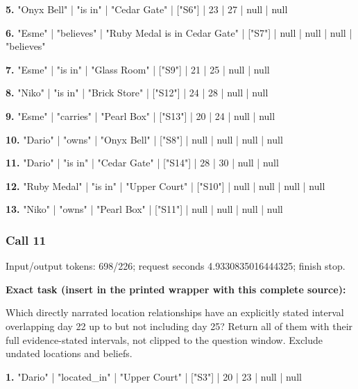 \noindent\textbf{5.} "Onyx Bell" | "is in" | "Cedar Gate" | ["S6"] | 23 | 27 | null | null\par\smallskip

\noindent\textbf{6.} "Esme" | "believes" | "Ruby Medal is in Cedar Gate" | ["S7"] | null | null | null | "believes"\par\smallskip

\noindent\textbf{7.} "Esme" | "is in" | "Glass Room" | ["S9"] | 21 | 25 | null | null\par\smallskip

\noindent\textbf{8.} "Niko" | "is in" | "Brick Store" | ["S12"] | 24 | 28 | null | null\par\smallskip

\noindent\textbf{9.} "Esme" | "carries" | "Pearl Box" | ["S13"] | 20 | 24 | null | null\par\smallskip

\noindent\textbf{10.} "Dario" | "owns" | "Onyx Bell" | ["S8"] | null | null | null | null\par\smallskip

\noindent\textbf{11.} "Dario" | "is in" | "Cedar Gate" | ["S14"] | 28 | 30 | null | null\par\smallskip

\noindent\textbf{12.} "Ruby Medal" | "is in" | "Upper Court" | ["S10"] | null | null | null | null\par\smallskip

\noindent\textbf{13.} "Niko" | "owns" | "Pearl Box" | ["S11"] | null | null | null | null\par\smallskip

\subsubsection*{Call 11}

Input/output tokens: 698/226; request seconds 4.9330835016444325; finish stop.

\noindent\textbf{Exact task (insert in the printed wrapper with this complete source):}\par Which directly narrated location relationships have an explicitly stated interval overlapping day 22 up to but not including day 25? Return all of them with their full evidence-stated intervals, not clipped to the question window. Exclude undated locations and beliefs.

\noindent\textbf{1.} "Dario" | "located\_in" | "Upper Court" | ["S3"] | 20 | 23 | null | null\par\smallskip

